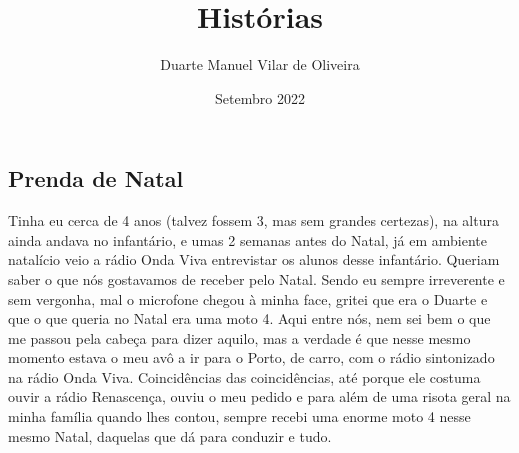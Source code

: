 \documentclass{article}
\title{Histórias}
\author{Duarte Manuel Vilar de Oliveira }
\date{Setembro  2022}
\begin{document}
\maketitle
\subsection{Prenda de Natal}
Tinha eu cerca de 4 anos (talvez fossem 3, mas sem grandes certezas), na altura ainda andava no infantário, e umas 2 semanas antes do Natal, já em ambiente natalício
veio a rádio Onda Viva entrevistar os alunos desse infantário. Queriam saber o que nós gostavamos de receber pelo Natal.
Sendo eu sempre irreverente e sem vergonha, mal o microfone chegou à minha face, gritei que era o Duarte e que o que queria no Natal era uma moto 4. 
Aqui entre nós, nem sei bem o que me passou pela cabeça para dizer aquilo, mas a verdade é que nesse mesmo momento estava o meu avô a ir para o Porto, de carro, com o rádio sintonizado na rádio Onda Viva.
Coincidências das coincidências, até porque ele costuma ouvir a rádio Renascença, ouviu o meu pedido e para além de uma risota geral na minha família quando lhes contou, sempre recebi uma enorme moto 4 nesse mesmo Natal, daquelas que dá para conduzir e tudo.  
\end{document}
